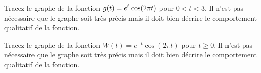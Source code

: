 \begin{question}[\eng \life]
Tracez le graphe de la fonction $\displaystyle g(t) = e^t \cos(2\pi t)$ pour $0<t<3$.
Il n'est pas nécessaire que le graphe soit très précis mais il doit
bien décrire le comportement qualitatif de la fonction.
\label{2Q32}
\end{question}

\begin{question}[\eng \life]
Tracez le graphe de la fonction $W(t) = e^{-t}\cos(2\pi t)$ pour $t\geq 0$.
Il n'est pas nécessaire que le graphe soit très précis mais il doit
bien décrire le comportement qualitatif de la fonction.
\label{2Q33}
\end{question}


